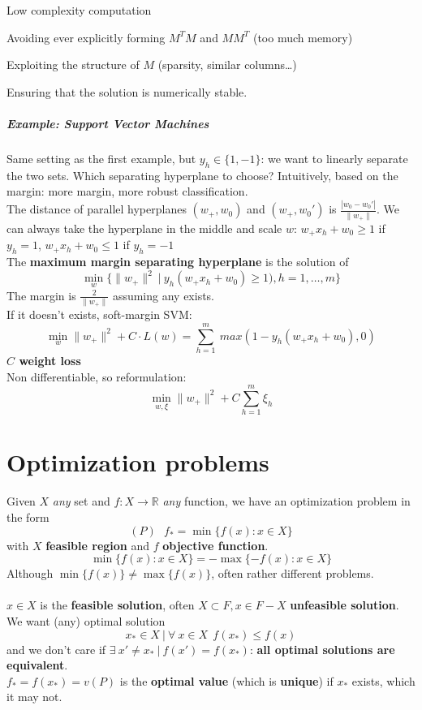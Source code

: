 \documentclass[10pt]{report}
\begin{document}
\begin{list}{}{}
	\item Low complexity computation
	\item Avoiding ever explicitly forming $M^TM$ and $MM^T$ (too much memory)
	\item Exploiting the structure of $M$ (sparsity, similar columns\ldots)
	\item Ensuring that the solution is numerically stable.
\end{list}
\subparagraph{Example: Support Vector Machines} Same setting as the first example, but $y_h\in\{1,-1\}$: we want to linearly separate the two sets. Which separating hyperplane to choose? Intuitively, based on the margin: more margin, more robust classification.\\
The distance of parallel hyperplanes $(w_+, w_0)$ and $(w_+, w_0')$ is $\frac{\displaystyle |w_0 - w_0'|}{\displaystyle \|w_+\|}$. We can always take the hyperplane in the middle and scale $w$: $w_+x_h + w_0 \geq 1$ if $y_h = 1$, $w_+x_h + w_0 \leq 1$ if $y_h = -1$\\
The \textbf{maximum margin separating hyperplane} is the solution of $$\min_w\{\|w_+\|^2\:|\:y_h(w_+x_h + w_0)\geq 1), h=1,\ldots,m\}$$ The margin is $\frac{2}{\|w_+\|}$ assuming any exists.\\
If it doesn't exists, soft-margin SVM: $$\min_w \|w_+\|^2 + C\cdot L(w) = \sum_{h=1}^m\:max(1-y_h(w_+x_h + w_0), 0)$$ \textbf{$C$ weight loss}\\
Non differentiable, so reformulation: $$\min_{w,\xi} \|w_+\|^2 + C\sum_{h=1}^m \xi_h$$
\section{Optimization problems}
Given $X$ \textit{any} set and $f:X\rightarrow \mathbb{R}$ \textit{any} function, we have an optimization problem in the form $$(P)\:\:\:f_*=\min\{f(x) : x\in X\}$$
with $X$ \textbf{feasible region} and $f$ \textbf{objective function}.
$$\min\{f(x) : x\in X\} = -\max\{-f(x) : x\in X\}$$
Although $\min\{f(x)\}\neq\max\{f(x)\}$, often rather different problems.\\\\
$x\in X$ is the \textbf{feasible solution}, often $X\subset F, x\in F-X$ \textbf{unfeasible solution}. We want (any) optimal solution $$x_* \in X\:|\:\forall\:x\in X\:\:f(x_*)\leq f(x)$$ and we don't care if $\exists\:x'\neq x_*\:|\:f(x')=f(x_*)$: \textbf{all optimal solutions are equivalent}.\\
$f_* = f(x_*) = v(P)$ is the \textbf{optimal value} (which is \textbf{unique}) if $x_*$ exists, which it may not.
\end{document}
